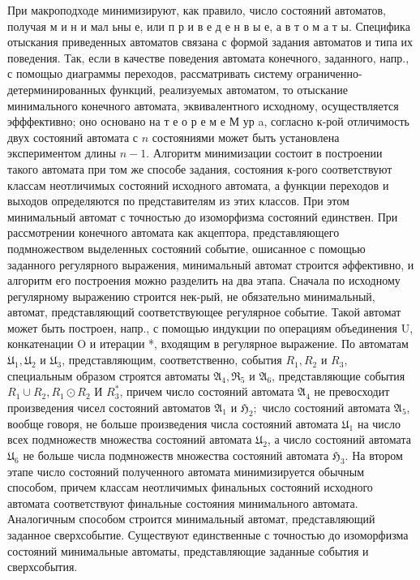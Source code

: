 \documentclass[10pt]{article}
\begin{document}
При макроподходе минимизируют, как правило, число состояний автоматов, получая м и н и мал ьны е, или п р и в е д е н в ы е, а в т о м а т ы. Специфика отыскания приведенных автоматов связана с формой задания автоматов и типа их поведения. Так, если в качестве поведения автомата конечного, заданного, напр., с помощыо диаграммы переходов, рассматривать систему ограниченно-детерминированных функций, реализуемых автоматом, то отыскание минимального конечного автомата, эквивалентного исходному, осуществляется эфффективно; оно основано на т е о р е м е М ур a, согласно к-рой отличимость двух состояний автомата с $n$ состояниями может быть установлена экспериментом длины $n-1$. Алгоритм минимизации состоит в построении такого автомата при том же способе задания, состояния к-рого соответствуют классам неотличимых состояний исходного автомата, а функции переходов и выходов определяются по представителям из этих классов. При этом минимальный автомат с точностью до изоморфизма состояний единствен. При рассмотрении конечного автомата как акцептора, представляющего подмножеством выделенных состояний событие, ошисанное с помощью заданного регулярного выражения, минимальный автомат строится әффективно, и алгоритм его построения можно разделить на два этапа. Сначала по исходному регулярному выражению строится нек-рый, не обязательно минимальный, автомат, представляющий соответствующее регулярное событие. Такой автомат может быть построен, напр., с помощью индукции по операциям объединения $\mathrm{U}$, конкатенации $\mathrm{O}$ и итерации *, входящим в регулярное выражение. По автоматам $\mathfrak{U}_{1}, \mathfrak{U}_{2}$ и $\mathfrak{U}_{3}$, представляющим, соответственно, события $R_{1}, R_{2}$ и $R_{3}$, специальным образом строятся автоматы $\mathfrak{A}_{4}, \mathfrak{\Re}_{5}$ и $\mathfrak{A}_{6}$, представляющие события $R_{1} \cup R_{2}, R_{1} \odot R_{2}$ И $R_{3}^{*}$, причем число состояний автомата $\mathfrak{A}_{4}$ не превосходит произведения чисел состояний автоматов $\mathfrak{A}_{1}$ и $\mathfrak{H}_{2} ;$ число состояний автомата $\mathfrak{A}_{5}$, вообще говоря, не больше произведения числа состояний автомата $\mathfrak{U}_{1}$ на число всех подмножеств множества состояний автомата $\mathfrak{U}_{2}$, а число состояний автомата $\mathfrak{U}_{6}$ не больше числа подмножеств множества состояний автомата $\mathfrak{H}_{3}$. На втором этапе число состояний полученного автомата минимизируется обычным способом, причем классам неотличимых финальных состояний исходного автомата соответствуют финальные состояния минимального автомата. Аналогичным способом строится минимальный автомат, представляющий заданное сверхсобытие. Существуют единственные с точностью до изоморфизма состояний минимальные автоматы, представляющие заданные события и сверхсобытия.
\end{document}
